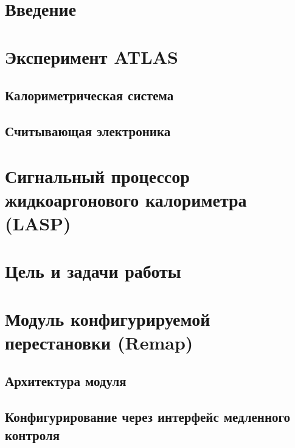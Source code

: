 \documentclass[a4paper, 14pt]{extarticle}
\begin{document}


\tableofcontents
\thispagestyle{empty}
\newpage

\setcounter{page}{3}
\section*{Введение}
    
    \newpage

\section{Эксперимент ATLAS}
    
    \subsection{Калориметрическая система}
    
    \subsection{Считывающая электроника}
    
    \newpage

\section{Сигнальный процессор жидкоаргонового калориметра (LASP)}
    
    \newpage

\section{Цель и задачи работы}
%    
    \newpage

\section{Модуль конфигурируемой перестановки (Remap)}
    
    \subsection{Архитектура модуля}
    
    \subsection{Конфигурирование через интерфейс медленного контроля}
    
\end{document}
